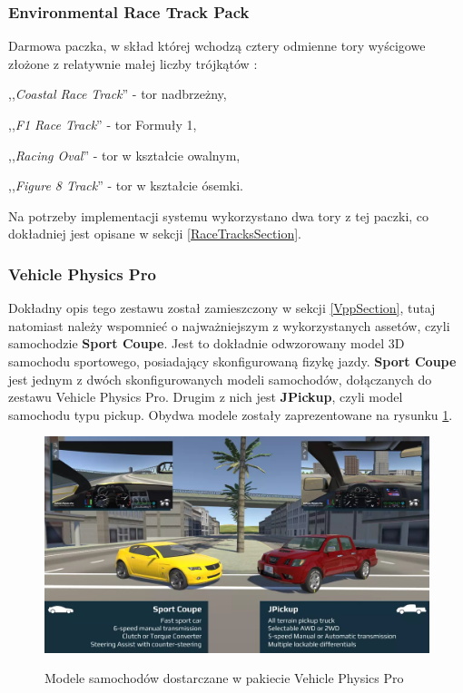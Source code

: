 \subsubsection{Environmental Race Track Pack}
Darmowa paczka, w skład której wchodzą cztery odmienne tory wyścigowe złożone z relatywnie małej liczby trójkątów \cite{unityAssets:envRaceTrackPack}:
\vspace{-0.5cm}
\begin{itemize*}
\item ,,\textit{Coastal Race Track}'' - tor nadbrzeżny,
\item ,,\textit{F1 Race Track}'' - tor Formuły 1,
\item ,,\textit{Racing Oval}'' - tor w kształcie owalnym,
\item ,,\textit{Figure 8 Track}'' - tor w kształcie ósemki.
\end{itemize*}
Na potrzeby implementacji systemu wykorzystano dwa tory z tej paczki, co dokładniej jest opisane w sekcji \ref{RaceTracksSection}.

\subsubsection{Vehicle Physics Pro}
Dokładny opis tego zestawu został zamieszczony w sekcji \ref{VppSection}, tutaj natomiast należy wspomnieć o najważniejszym z wykorzystanych assetów, czyli samochodzie \textbf{Sport Coupe}. Jest to dokładnie odwzorowany model 3D samochodu sportowego, posiadający skonfigurowaną fizykę jazdy. \textbf{Sport Coupe} jest jednym z dwóch skonfigurowanych modeli samochodów, dołączanych do zestawu Vehicle Physics Pro. Drugim z nich jest \textbf{JPickup}, czyli model samochodu typu pickup. Obydwa modele zostały zaprezentowane na rysunku \ref{VppCarModels}. \\

\begin{figure}[h]
\begin{center}
\includegraphics[width=14cm]{resources/figures/vpp-car-models.png}
\caption{Modele samochodów dostarczane w pakiecie Vehicle Physics Pro}
\label{VppCarModels}
\end{center}
\end{figure}

